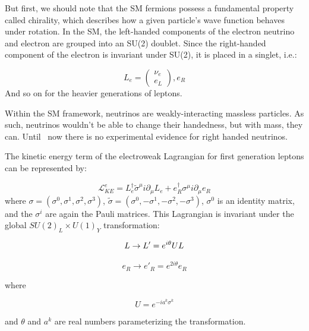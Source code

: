 But first, we should note that the SM fermions possess a fundamental property called chirality, which describes how a given particle's wave function behaves under rotation. In the SM, the left-handed components of the electron neutrino and electron are grouped into an SU(2) doublet. Since the right-handed component of the electron is invariant under SU(2), it is placed in a singlet, i.e.:

\begin{equation}
L_{e} = \begin{pmatrix}
	\nu_{e} \\
	e_{L}
\end{pmatrix}
, e_{R}
\end{equation}
 And so on for the heavier generations of leptons. 

Within the SM framework, neutrinos are weakly-interacting massless particles. As such, neutrinos wouldn't be able to change their handedness, but with mass, they can. Until \
now there is no experimental evidence for right handed neutrinos.

 The kinetic energy term of the electroweak Lagrangian for first generation leptons can be represented by:

 \begin{equation}
 \mathcal{L}_{KE}^{e} = L_{e}^{\dagger}\tilde{\sigma}^{\mu}i\partial_{\mu}L_{e}+ e_{R}^{\dagger}\sigma^{\mu}i\partial_{\mu}e_{R}
 \end{equation}
where $\sigma = (\sigma^{0}, \sigma^{1},\sigma^{2}, \sigma^{3})$, $\tilde{\sigma} = (\sigma^{0}, -\sigma^{1},-\sigma^{2}, -\sigma^{3})$, $\sigma^{0}$ is an identity matrix, and the $\sigma^{i}$ are again the Pauli matrices. This Lagrangian is invariant under the global $SU(2)_{L}\times U(1)_{Y}$ transformation:

\begin{equation}
L\rightarrow L' = e^{i\theta}UL\\
\end{equation}

\begin{equation}
e_{R}\rightarrow e'_{R} = e^{2i\theta}e_{R}
\end{equation}

where

\begin{equation}
U = e^{-ia^{k}\sigma^{k}}
\end{equation}

and $\theta$ and $a^{k}$ are real numbers parameterizing the transformation.

